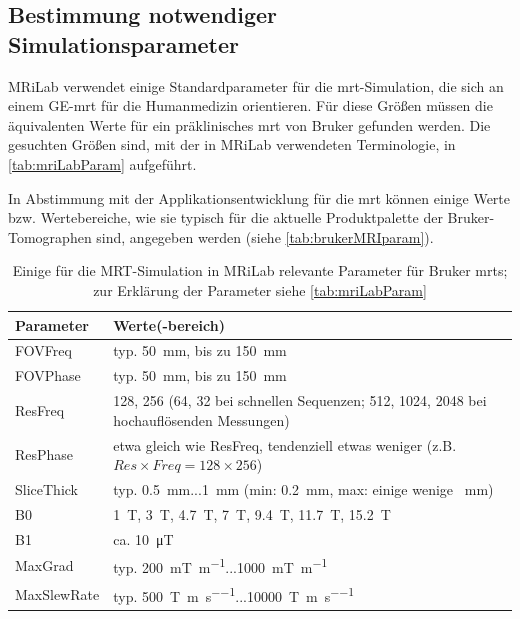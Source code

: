 \subsection{Bestimmung notwendiger Simulationsparameter}
MRiLab verwendet einige Standardparameter für die \gls{mrt}-Simulation, die sich an einem GE-\gls{mrt} für die Humanmedizin orientieren. Für diese Größen müssen die äquivalenten Werte für ein präklinisches \gls{mrt} von Bruker gefunden werden. Die gesuchten Größen sind, mit der in MRiLab verwendeten Terminologie, in \autoref{tab:mriLabParam} aufgeführt.

In Abstimmung mit der Applikationsentwicklung für die \gls{mrt} können einige Werte bzw. Wertebereiche, wie sie typisch für die aktuelle Produktpalette der Bruker-Tomographen sind, angegeben werden (siehe \autoref{tab:brukerMRIparam}). 

\begin{table}[H]
	\centering
	\caption[Simulationsparameter für Bruker MRTs]{Einige für die MRT-Simulation in MRiLab relevante Parameter für Bruker \gls{mrt}s; zur Erklärung der Parameter siehe \autoref{tab:mriLabParam}}
	\label{tab:brukerMRIparam}
	\begin{tabularx}{\textwidth}{lX}
		\toprule
		\textbf{Parameter} & \textbf{Werte(-bereich)}\\
		\midrule
		FOVFreq    & typ. \SI{50}{\mm}, bis zu \SI{150}{\mm}\\
		FOVPhase   & typ. \SI{50}{\mm}, bis zu \SI{150}{\mm}\\
		ResFreq    & 128, 256 (64, 32 bei schnellen Sequenzen; 512, 1024, 2048 bei hochauflösenden Messungen)\\
		ResPhase   & etwa gleich wie ResFreq, tendenziell etwas weniger (z.B. $Res \times Freq=128\times256$)\\
		SliceThick & typ. \SI{0.5}{\mm}...\SI{1}{\mm} (min: \SI{0.2}{\mm}, max: einige wenige \SI{}{\mm})\\
		B0         & \SI{1}{\tesla}, \SI{3}{\tesla}, \SI{4.7}{\tesla}, \SI{7}{\tesla}, \SI{9.4}{\tesla}, \SI{11.7}{\tesla}, \SI{15.2}{\tesla} \\
		B1         & ca. \SI{10}{\micro\tesla}\\
		MaxGrad    & typ. \SI{200}{\milli\tesla\per\m}...\SI{1000}{\milli\tesla\per\m}\\
		MaxSlewRate& typ. \SI{500}{\tesla\per\m\per\s}...\SI{10000}{\tesla\per\m\per\s}\\
		\bottomrule
	\end{tabularx}
\end{table}

